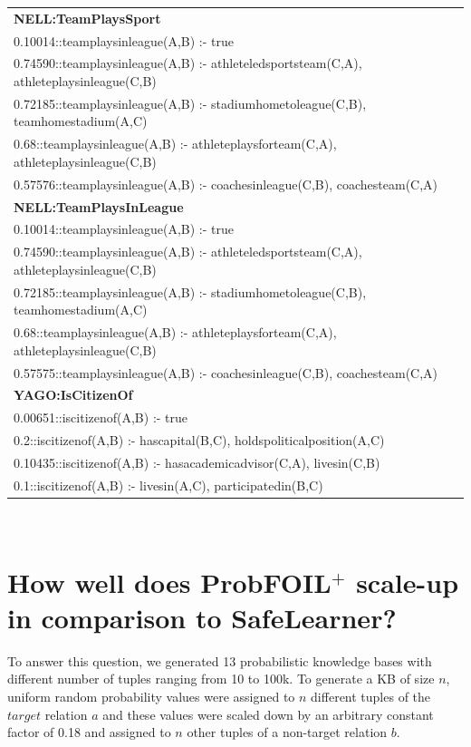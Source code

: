 \documentclass[akbc,twoside,11pt]{article}
\newcommand{\algorithmname}{SafeLearner\xspace}
\begin{document}
\begin{footnotesize}
\begin{tabular}{|l|}
\textbf{NELL:TeamPlaysSport}  \\
0.10014::teamplaysinleague(A,B) :- true \\
0.74590::teamplaysinleague(A,B) :- athleteledsportsteam(C,A), athleteplaysinleague(C,B) \\
0.72185::teamplaysinleague(A,B) :- stadiumhometoleague(C,B), teamhomestadium(A,C) \\
0.68::teamplaysinleague(A,B) :- athleteplaysforteam(C,A), athleteplaysinleague(C,B) \\
0.57576::teamplaysinleague(A,B) :- coachesinleague(C,B), coachesteam(C,A) \\[2ex]
\textbf{NELL:TeamPlaysInLeague} \\
0.10014::teamplaysinleague(A,B) :- true \\
0.74590::teamplaysinleague(A,B) :- athleteledsportsteam(C,A), athleteplaysinleague(C,B) \\
0.72185::teamplaysinleague(A,B) :- stadiumhometoleague(C,B), teamhomestadium(A,C) \\
0.68::teamplaysinleague(A,B) :- athleteplaysforteam(C,A), athleteplaysinleague(C,B) \\
0.57575::teamplaysinleague(A,B) :- coachesinleague(C,B), coachesteam(C,A) \\[2ex]
\textbf{YAGO:IsCitizenOf} \\
0.00651::iscitizenof(A,B) :- true \\
0.2::iscitizenof(A,B) :- hascapital(B,C), holdspoliticalposition(A,C) \\
0.10435::iscitizenof(A,B) :- hasacademicadvisor(C,A), livesin(C,B) \\
0.1::iscitizenof(A,B) :- livesin(A,C), participatedin(B,C) \\
\hline
\end{tabular}\\
\end{footnotesize}


\section{How well does ProbFOIL$^+$ scale-up in comparison to \algorithmname?}\label{appendix:3}
To answer this question, we generated 13 probabilistic knowledge bases with different number of tuples ranging from 10 to 100k. To generate a KB of size $n$, uniform random probability values were assigned to $n$ different tuples of the $target$ relation $a$ and these values were scaled down by an arbitrary constant factor of 0.18 and assigned to $n$ other tuples of a non-target relation $b$. 
\end{document}
